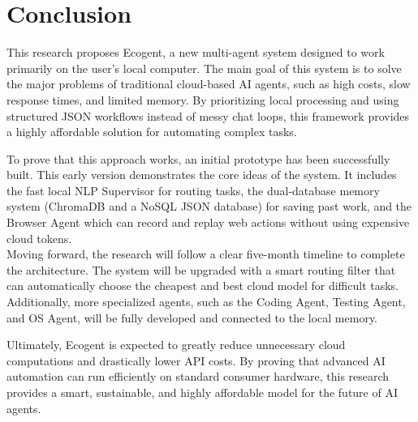\section{Conclusion}
This research proposes Ecogent, a new multi-agent system designed to work primarily on the user's local computer. The main goal of this system is to solve the major problems of traditional cloud-based AI agents, such as high costs, slow response times, and limited memory. By prioritizing local processing and using structured JSON workflows instead of messy chat loops, this framework provides a highly affordable solution for automating complex tasks.

To prove that this approach works, an initial prototype has been successfully built. This early version demonstrates the core ideas of the system. It includes the fast local NLP Supervisor for routing tasks, the dual-database memory system (ChromaDB and a NoSQL JSON database) for saving past work, and the Browser Agent which can record and replay web actions without using expensive cloud tokens.\\

Moving forward, the research will follow a clear five-month timeline to complete the architecture. The system will be upgraded with a smart routing filter that can automatically choose the cheapest and best cloud model for difficult tasks. Additionally, more specialized agents, such as the Coding Agent, Testing Agent, and OS Agent, will be fully developed and connected to the local memory.

Ultimately, Ecogent is expected to greatly reduce unnecessary cloud computations and drastically lower API costs. By proving that advanced AI automation can run efficiently on standard consumer hardware, this research provides a smart, sustainable, and highly affordable model for the future of AI agents.
